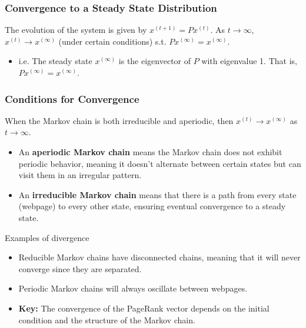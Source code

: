 \subsubsection{Convergence to a Steady State Distribution}
\begin{definition}
    The evolution of the system is given by $x^{(t+1)} = P x^{(t)}$. As $t \to \infty$, $x^{(t)} \to x^{(\infty)}$ (under certain conditions) s.t. $Px^{(\infty)}=x^{(\infty)}$.
    \begin{itemize}
        \item i.e. The steady state $x^{(\infty)}$ is the eigenvector of $P$ with eigenvalue 1. That is, $P x^{(\infty)} = x^{(\infty)}$. 
    \end{itemize}
\end{definition}

\subsubsection{Conditions for Convergence}
\begin{definition}
    When the Markov chain is both irreducible and aperiodic, then $x^{(t)} \to x^{(\infty)}$ as $t \to \infty$.
    \begin{itemize}
        \item An \textbf{aperiodic Markov chain} means the Markov chain does not exhibit periodic behavior, meaning it doesn't alternate between certain states but can visit them in an irregular pattern.
        \item An \textbf{irreducible Markov chain} means that there is a path from every state (webpage) to every other state, ensuring eventual convergence to a steady state.
    \end{itemize}
\end{definition}

\begin{example} Examples of divergence
    \begin{itemize}
        \item Reducible Markov chains have disconnected chains, meaning that it will never converge since they are separated.
        \item Periodic Markov chains will always oscillate between webpages.
        \item \textbf{Key:} The convergence of the PageRank vector depends on the initial condition and the structure of the Markov chain.
    \end{itemize}
\end{example}

